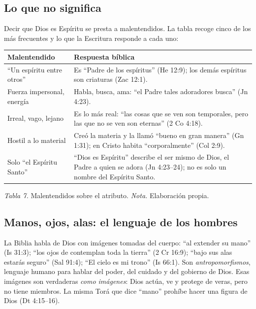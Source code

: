 \subsection{Lo que no significa}

Decir que Dios es Espíritu se presta a malentendidos. La tabla recoge cinco de los más frecuentes y lo que la Escritura responde a cada uno:

\begin{center}\small\renewcommand{\arraystretch}{1.25}
\begin{tabular}{@{}L{4.0cm}L{10.2cm}@{}}
\toprule
\textbf{Malentendido} & \textbf{Respuesta bíblica} \\ \midrule
``Un espíritu entre otros'' & Es ``Padre de los espíritus'' (He 12:9); los demás espíritus son criaturas (Zac 12:1). \\
Fuerza impersonal, energía & Habla, busca, ama: ``el Padre tales adoradores busca'' (Jn 4:23). \\
Irreal, vago, lejano & Es lo más real: ``las cosas que se ven son temporales, pero las que no se ven son eternas'' (2 Co 4:18). \\
Hostil a lo material & Creó la materia y la llamó ``bueno en gran manera'' (Gn 1:31); en Cristo habita ``corporalmente'' (Col 2:9). \\
Solo ``el Espíritu Santo'' & ``Dios es Espíritu'' describe el ser mismo de Dios, el Padre a quien se adora (Jn 4:23--24); no es solo un nombre del Espíritu Santo. \\
\bottomrule
\end{tabular}\par
{\footnotesize\color{gris}\textit{Tabla 7.} Malentendidos sobre el atributo. \textit{Nota.} Elaboración propia.}
\end{center}

\subsection{Manos, ojos, alas: el lenguaje de los hombres}

La Biblia habla de Dios con imágenes tomadas del cuerpo: ``al extender \SENOR{} su mano'' (Is 31:3); ``los ojos de \SENOR{} contemplan toda la tierra'' (2 Cr 16:9); ``bajo sus alas estarás seguro'' (Sal 91:4); ``El cielo es mi trono'' (Is 66:1). Son \emph{antropomorfismos}, lenguaje humano para hablar del poder, del cuidado y del gobierno de Dios. Esas imágenes son verdaderas \emph{como imágenes}: Dios actúa, ve y protege de veras, pero no tiene miembros. La misma Torá que dice ``mano'' prohíbe hacer una figura de Dios (Dt 4:15--16).

